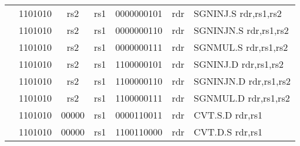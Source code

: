 \begin{table}[p]
\begin{small}
\begin{center}
\begin{tabular}{rcccccccccl}
&
\multicolumn{2}{|c|}{1101010} &
\multicolumn{1}{c|}{rs2} &
\multicolumn{1}{c|}{rs1} &
\multicolumn{4}{c|}{0000000101} &
\multicolumn{1}{c|}{rdr} & SGNINJ.S rdr,rs1,rs2 \\
\cline{2-10}
  

&
\multicolumn{2}{|c|}{1101010} &
\multicolumn{1}{c|}{rs2} &
\multicolumn{1}{c|}{rs1} &
\multicolumn{4}{c|}{0000000110} &
\multicolumn{1}{c|}{rdr} & SGNINJN.S rdr,rs1,rs2 \\
\cline{2-10}
  

&
\multicolumn{2}{|c|}{1101010} &
\multicolumn{1}{c|}{rs2} &
\multicolumn{1}{c|}{rs1} &
\multicolumn{4}{c|}{0000000111} &
\multicolumn{1}{c|}{rdr} & SGNMUL.S rdr,rs1,rs2 \\
\cline{2-10}
  

&
\multicolumn{2}{|c|}{1101010} &
\multicolumn{1}{c|}{rs2} &
\multicolumn{1}{c|}{rs1} &
\multicolumn{4}{c|}{1100000101} &
\multicolumn{1}{c|}{rdr} & SGNINJ.D rdr,rs1,rs2 \\
\cline{2-10}
  

&
\multicolumn{2}{|c|}{1101010} &
\multicolumn{1}{c|}{rs2} &
\multicolumn{1}{c|}{rs1} &
\multicolumn{4}{c|}{1100000110} &
\multicolumn{1}{c|}{rdr} & SGNINJN.D rdr,rs1,rs2 \\
\cline{2-10}
  

&
\multicolumn{2}{|c|}{1101010} &
\multicolumn{1}{c|}{rs2} &
\multicolumn{1}{c|}{rs1} &
\multicolumn{4}{c|}{1100000111} &
\multicolumn{1}{c|}{rdr} & SGNMUL.D rdr,rs1,rs2 \\
\cline{2-10}
  

&
\multicolumn{2}{|c|}{1101010} &
\multicolumn{1}{c|}{00000} &
\multicolumn{1}{c|}{rs1} &
\multicolumn{4}{c|}{0000110011} &
\multicolumn{1}{c|}{rdr} & CVT.S.D rdr,rs1 \\
\cline{2-10}
  

&
\multicolumn{2}{|c|}{1101010} &
\multicolumn{1}{c|}{00000} &
\multicolumn{1}{c|}{rs1} &
\multicolumn{4}{c|}{1100110000} &
\multicolumn{1}{c|}{rdr} & CVT.D.S rdr,rs1 \\
\cline{2-10}
  

\end{tabular}
\end{center}
\end{small}

\label{instr-table}
\end{table}
  

\newpage

